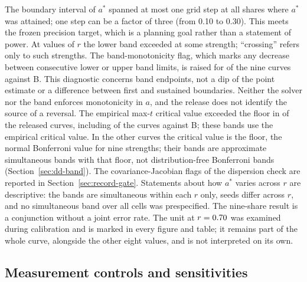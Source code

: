 The boundary interval of $a^*$ spanned at most one grid step at all  shares where $a^*$ was attained; one step can be a factor of three (from 0.10 to 0.30). This meets the frozen precision target, which is a planning goal rather than a statement of power. At  values of $r$ the lower band exceeded  at some strength; ``crossing'' refers only to such strengths.
The band-monotonicity flag, which marks any decrease between consecutive lower or upper band limits, is raised for  of the nine curves against B. This diagnostic concerns band endpoints, not a dip of the point estimate or a difference between first and sustained boundaries. Neither the solver nor the band enforces monotonicity in $a$, and the release does not identify the source of a reversal.
The empirical max-$t$ critical value exceeded the  floor in  of the  released curves, including  of the curves against B; these bands use the empirical critical value. In the other curves the critical value is the floor, the normal Bonferroni value for nine strengths; their bands are approximate simultaneous bands with that floor, not distribution-free Bonferroni bands (Section~\ref{sec:dd-band}). The covariance-Jacobian flags of the dispersion check are reported in Section~\ref{sec:record-gate}.
Statements about how $a^*$ varies across $r$ are descriptive: the bands are simultaneous within each $r$ only, seeds differ across $r$, and no simultaneous band over all  cells was prespecified. The nine-share result is a conjunction without a joint error rate. The unit at $r=\resultnum{v4.protocol.r.070}{0.70}$ was examined during calibration and is marked in every figure and table; it remains part of the whole curve, alongside the other eight values, and is not interpreted on its own.



\subsection{Measurement controls and sensitivities}\label{sec:additional-controls}

